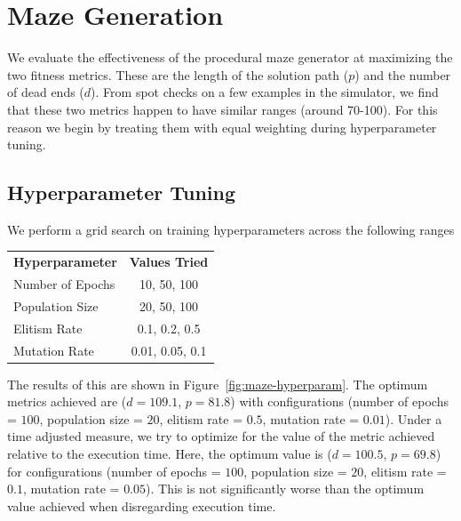 \section{Maze Generation}
We evaluate the effectiveness of the procedural maze generator at maximizing the two fitness metrics. These are the length of the solution path ($p$) and the number of dead ends ($d$). From spot checks on a few examples in the simulator, we find that these two metrics happen to have similar ranges (around 70-100). For this reason we begin by treating them with equal weighting during hyperparameter tuning.\\

\subsection{Hyperparameter Tuning}

We perform a grid search on training hyperparameters across the following ranges
\begin{center}
    \begin{tabular}{ l c }
        \bf Hyperparameter & \bf Values Tried\\
        Number of Epochs & {10, 50, 100}\\
        Population Size & {20, 50, 100}\\
        Elitism Rate & {0.1, 0.2, 0.5}\\
        Mutation Rate & {0.01, 0.05, 0.1}
    \end{tabular}
\end{center}

The results of this are shown in Figure~\ref{fig:maze-hyperparam}. The optimum metrics achieved are ($d=109.1$, $p=81.8$) with configurations (number of epochs = $100$, population size = $20$, elitism rate = $0.5$, mutation rate = $0.01$). Under a time adjusted measure, we try to optimize for the value of the metric achieved relative to the execution time. Here, the optimum value is ($d=100.5$, $p=69.8$) for configurations (number of epochs = $100$, population size = $20$, elitism rate = $0.1$, mutation rate = $0.05$). This is not significantly worse than the optimum value achieved when disregarding execution time.

